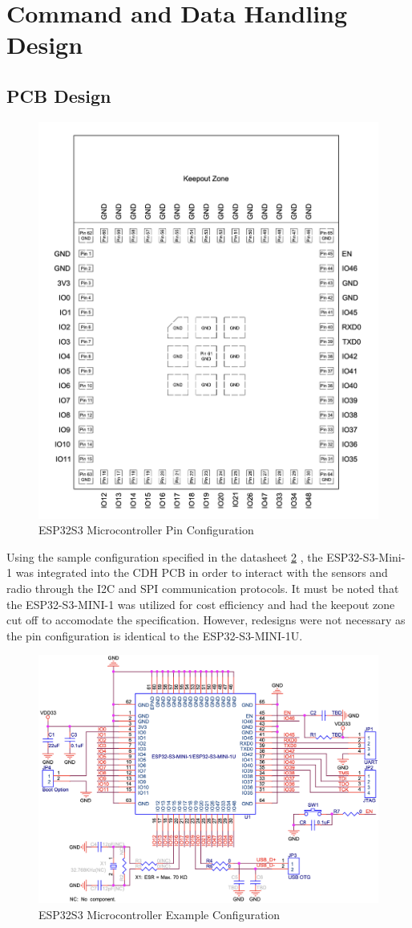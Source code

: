 \documentclass{report}
\begin{document}
        \section{Command and Data Handling Design}
            \subsection{PCB Design}
                \begin{figure}[H]
                    \centering
                    \includegraphics[width=0.4\linewidth]{figures/MC_PINS.png}
                    \caption{ESP32S3 Microcontroller Pin Configuration}
                    \label{fig:mc_pins}
                \end{figure}
                Using the sample configuration specified in the datasheet \ref{fig:mc_example} \cite{esp32s3mini}, 
                the ESP32-S3-Mini-1 was integrated into the CDH PCB in order to interact with 
                the sensors and radio through the I2C and SPI communication protocols.
                It must be noted that the ESP32-S3-MINI-1 was utilized for cost efficiency and had the keepout zone cut off to accomodate the 
                specification. However, redesigns were not necessary as the pin configuration is identical to the ESP32-S3-MINI-1U.
                \begin{figure}[H]
                    \centering
                    \includegraphics[width=0.4\linewidth]{figures/ESP32S3_EXAMPLE.png}
                    \caption{ESP32S3 Microcontroller Example Configuration}
                    \label{fig:mc_example}
                \end{figure}
\end{document}

